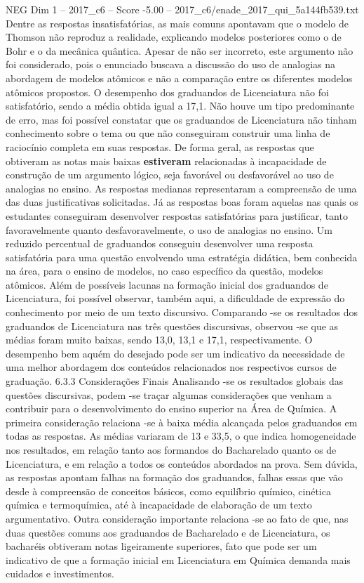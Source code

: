 \begin{textsample}{NEG Dim 1 – 2017\_c6 – Score -5.00 – 2017\_c6/enade\_2017\_qui\_5a144fb539.txt}
Dentre as respostas insatisfatórias, as mais comuns apontavam que o modelo de Thomson não reproduz a realidade, explicando modelos posteriores como o de Bohr e o da mecânica quântica.
Apesar de não ser incorreto, este argumento não foi considerado, pois o enunciado buscava a discussão do uso de analogias na abordagem de modelos atômicos e não a comparação entre os diferentes modelos atômicos propostos.
O desempenho dos graduandos de Licenciatura não foi satisfatório, sendo a média obtida igual a 17,1.
Não houve um tipo predominante de erro, mas foi possível constatar que os graduandos de Licenciatura não tinham conhecimento sobre o tema ou que não conseguiram construir uma linha de raciocínio completa em suas respostas.
De forma geral, as respostas que obtiveram as notas mais baixas \textbf{estiveram} relacionadas à incapacidade de construção de um argumento lógico, seja favorável ou desfavorável ao uso de analogias no ensino.
As respostas medianas representaram a compreensão de uma das duas justificativas solicitadas.
Já as respostas boas foram aquelas nas quais os estudantes conseguiram desenvolver respostas satisfatórias para justificar, tanto favoravelmente quanto desfavoravelmente, o uso de analogias no ensino.
Um reduzido percentual de graduandos conseguiu desenvolver uma resposta satisfatória para uma questão envolvendo uma estratégia didática, bem conhecida na área, para o ensino de modelos, no caso específico da questão, modelos atômicos.
Além de possíveis lacunas na formação inicial dos graduandos de Licenciatura, foi possível observar, também aqui, a dificuldade de expressão do conhecimento por meio de um texto discursivo.
Comparando -se os resultados dos graduandos de Licenciatura nas três questões discursivas, observou -se que as médias foram muito baixas, sendo 13,0, 13,1 e 17,1, respectivamente.
O desempenho bem aquém do desejado pode ser um indicativo da necessidade de uma melhor abordagem dos conteúdos relacionados nos respectivos cursos de graduação. 6.3.3 Considerações Finais Analisando -se os resultados globais das questões discursivas, podem -se traçar algumas considerações que venham a contribuir para o desenvolvimento do ensino superior na Área de Química.
A primeira consideração relaciona -se à baixa média alcançada pelos graduandos em todas as respostas.
As médias variaram de 13 e 33,5, o que indica homogeneidade nos resultados, em relação tanto aos formandos do Bacharelado quanto os de Licenciatura, e em relação a todos os conteúdos abordados na prova.
Sem dúvida, as respostas apontam falhas na formação dos graduandos, falhas essas que vão desde à compreensão de conceitos básicos, como equilíbrio químico, cinética química e termoquímica, até à incapacidade de elaboração de um texto argumentativo.
Outra consideração importante relaciona -se ao fato de que, nas duas questões comuns aos graduandos de Bacharelado e de Licenciatura, os bacharéis obtiveram notas ligeiramente superiores, fato que pode ser um indicativo de que a formação inicial em Licenciatura em Química demanda mais cuidados e investimentos.

\end{textsample}
